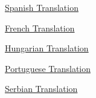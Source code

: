               
              
              
                
              
              
              
                \href{http://www.fduran.com/wordpress/?p=31}{Spanish Translation}


              
            
            
              
            
            
              
            
            
              
                
              
              
              
                \href{http://penelope.jdsfriends.com/DWYL\_francais.htm}{French Translation}


              
              
              
                
              
              
              
                \href{http://www.shin.hu/paulgraham/whatyoulove.html}{Hungarian Translation}


              
            
            
              
            
            
              
            
            
              
                
              
              
              
                \href{http://aramos.org/2008/01/resolucoes-de-ano-novo-como-fazer-o-que-voce-ama/}{Portuguese Translation}


              
              
              
                
              
              
              
                \href{http://ground.gr/krosv.html}{Serbian Translation}


              
            
            
              
            
            
